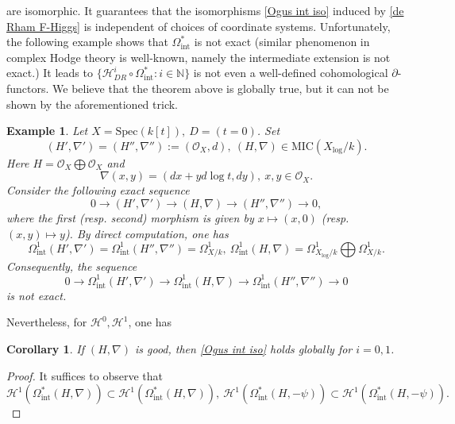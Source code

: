 \documentclass[12pt, a4paper]{article}
\newtheorem{corollary}{Corollary}[section]
\newtheorem{example}{Example}[section]
\begin{document}
are isomorphic. It guarantees that the isomorphisms \eqref{Ogus int iso} induced by \eqref{de Rham F-Higgs} is independent of choices of coordinate systems. Unfortunately, the following example shows that $\Omega^*_\mathrm{int}$ is not exact (similar phenomenon in complex Hodge theory is well-known, namely the intermediate extension is not exact.) It leads to $\{\mathcal H_{DR}^i\circ\Omega_\mathrm{int}^*: i\in\mathbb N\}$ is not even a well-defined cohomological $\partial$-functors. We believe that the theorem above is globally true, but it can not be shown by the aforementioned trick.
\begin{example} 
Let $X=\mathrm{Spec}(k[t]), ~D=(t=0)$. Set 
$$
(H',\nabla')=(H'',\nabla''):=(\mathcal O_X,d),~(H,\nabla)\in\mathrm{MIC}(X_{\log}/k).
$$
Here $H=\mathcal O_X\bigoplus\mathcal O_X$ and 
$$
\nabla(x,y)=(dx+yd\log t,dy),~x,y\in\mathcal O_X.
$$
Consider the following exact sequence
$$
0\to(H',\nabla')\to(H,\nabla)\to(H'',\nabla'')\to0,
$$
where the first (resp. second) morphism is given by $x\mapsto(x,0)$ (resp. $(x,y)\mapsto y$). By direct computation, one has
$$
\Omega^1_\mathrm{int}(H',\nabla')=\Omega^1_\mathrm{int}(H'',\nabla'')=\Omega^1_{X/k},~\Omega^1_\mathrm{int}(H,\nabla)=\Omega^1_{X_{\log}/k}\bigoplus\Omega^1_{X/k}.
$$
Consequently, the sequence 
$$
0\to\Omega^1_\mathrm{int}(H',\nabla')\to\Omega^1_\mathrm{int}(H,\nabla)\to\Omega^1_\mathrm{int}(H'',\nabla'')\to0
$$
is not exact.
\end{example}
Nevertheless, for $\mathcal H^0,\mathcal H^1$, one has
\begin{corollary}
If $(H,\nabla)$ is good, then \eqref{Ogus int iso} holds globally for $i=0,1$.
\end{corollary}
\begin{proof}
It suffices to observe that 
$$\mathcal H^1(\Omega_\mathrm{int}^*(H,\nabla))\subset\mathcal H^1(\Omega_\mathrm{int}^*(H,\nabla)),~\mathcal H^1(\Omega_\mathrm{int}^*(H,-\psi))\subset\mathcal H^1(\Omega_\mathrm{int}^*(H,-\psi)).$$
\end{proof}
\fi
\end{document}
